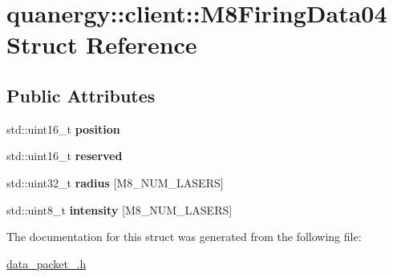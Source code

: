 \hypertarget{structquanergy_1_1client_1_1M8FiringData04}{\section{quanergy\-:\-:client\-:\-:M8\-Firing\-Data04 Struct Reference}
\label{structquanergy_1_1client_1_1M8FiringData04}
}
\subsection*{Public Attributes}
\begin{DoxyCompactItemize}
\item 
\hypertarget{structquanergy_1_1client_1_1M8FiringData04_a1af27702635007a368cd8c1be0ab755a}{std\-::uint16\-\_\-t {\bfseries position}}\label{structquanergy_1_1client_1_1M8FiringData04_a1af27702635007a368cd8c1be0ab755a}

\item 
\hypertarget{structquanergy_1_1client_1_1M8FiringData04_afa51d6d14df19877acbfe95cfdba6ca7}{std\-::uint16\-\_\-t {\bfseries reserved}}\label{structquanergy_1_1client_1_1M8FiringData04_afa51d6d14df19877acbfe95cfdba6ca7}

\item 
\hypertarget{structquanergy_1_1client_1_1M8FiringData04_ade428aa1f8c3a5ff5547b35ce3fc2d82}{std\-::uint32\-\_\-t {\bfseries radius} \mbox{[}M8\-\_\-\-N\-U\-M\-\_\-\-L\-A\-S\-E\-R\-S\mbox{]}}\label{structquanergy_1_1client_1_1M8FiringData04_ade428aa1f8c3a5ff5547b35ce3fc2d82}

\item 
\hypertarget{structquanergy_1_1client_1_1M8FiringData04_a889d0abf171b7b7c2df43a42a945a0f4}{std\-::uint8\-\_\-t {\bfseries intensity} \mbox{[}M8\-\_\-\-N\-U\-M\-\_\-\-L\-A\-S\-E\-R\-S\mbox{]}}\label{structquanergy_1_1client_1_1M8FiringData04_a889d0abf171b7b7c2df43a42a945a0f4}

\end{DoxyCompactItemize}


The documentation for this struct was generated from the following file\-:\begin{DoxyCompactItemize}
\item 
\hyperlink{data__packet__04_8h}{data\-\_\-packet\-\_.\-h}\end{DoxyCompactItemize}
